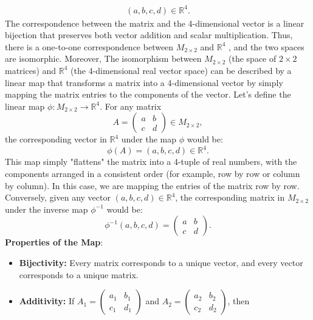 \documentclass{report}
\begin{document}
\begin{itemize}
\begin{align*}
                (a,b,c,d) \in \mathbb{R}^{4}
            .\end{align*}
            \bigbreak \noindent 
            The correspondence between the matrix and the 4-dimensional vector is a linear bijection that preserves both vector addition and scalar multiplication. Thus, there is a one-to-one correspondence between $M_{2\times 2}$ and $\mathbb{R}^{4}$ , and the two spaces are isomorphic.
            \bigbreak \noindent 
            Moreover, 
            The isomorphism between $M_{2 \times 2}$ (the space of $2 \times 2$ matrices) and $\mathbb{R}^4$ (the 4-dimensional real vector space) can be described by a linear map that transforms a matrix into a 4-dimensional vector by simply mapping the matrix entries to the components of the vector.
            \bigbreak \noindent 
            Let’s define the linear map $\phi: M_{2 \times 2} \to \mathbb{R}^4$.
            \bigbreak \noindent 
            For any matrix
            \[
                A = \begin{pmatrix}
                    a & b \\
                    c & d
                \end{pmatrix} \in M_{2 \times 2},
            \]
            the corresponding vector in $\mathbb{R}^4$ under the map $\phi$ would be:
            \[
                \phi(A) = (a, b, c, d) \in \mathbb{R}^4.
            \]
            This map simply "flattens" the matrix into a 4-tuple of real numbers, with the components arranged in a consistent order (for example, row by row or column by column). In this case, we are mapping the entries of the matrix row by row.
            \bigbreak \noindent 
            Conversely, given any vector $(a, b, c, d) \in \mathbb{R}^4$, the corresponding matrix in $M_{2 \times 2}$ under the inverse map $\phi^{-1}$ would be:
            \[
                \phi^{-1}(a, b, c, d) = \begin{pmatrix}
                    a & b \\
                    c & d
                \end{pmatrix}.
            \]
            \textbf{Properties of the Map}:
            \begin{itemize}
                \item \textbf{Bijectivity:} Every matrix corresponds to a unique vector, and every vector corresponds to a unique matrix.
                \item \textbf{Additivity:} If $A_1 = \begin{pmatrix} a_1 & b_1 \\ c_1 & d_1 \end{pmatrix}$ and $A_2 = \begin{pmatrix} a_2 & b_2 \\ c_2 & d_2 \end{pmatrix}$, then

\end{itemize}
\end{itemize}
\end{document}
